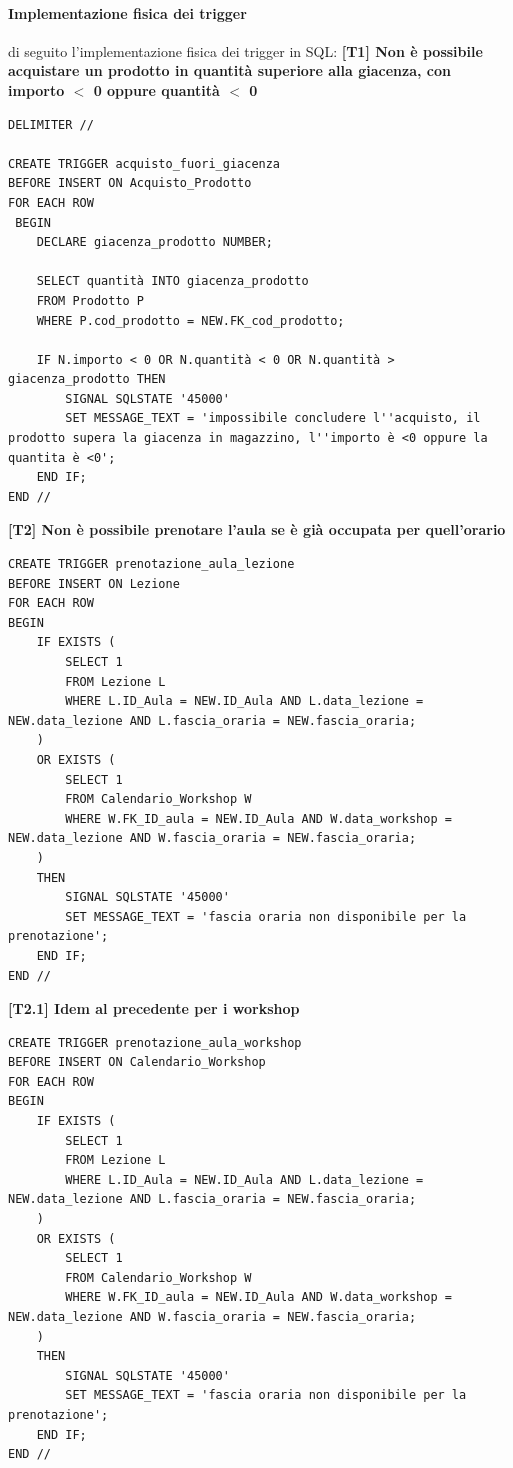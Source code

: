 \paragraph{Implementazione fisica dei trigger} di seguito l'implementazione fisica dei trigger in SQL: 
\newline
\newline
\textbf{[T1] Non è possibile acquistare un prodotto in quantità superiore alla giacenza, con importo $<$ 0 \newline oppure quantità $<$ 0}
\begin{lstlisting}
DELIMITER //

CREATE TRIGGER acquisto_fuori_giacenza 
BEFORE INSERT ON Acquisto_Prodotto
FOR EACH ROW
 BEGIN
	DECLARE giacenza_prodotto NUMBER; 
	
	SELECT quantità INTO giacenza_prodotto
	FROM Prodotto P
	WHERE P.cod_prodotto = NEW.FK_cod_prodotto;
	
	IF N.importo < 0 OR N.quantità < 0 OR N.quantità > giacenza_prodotto THEN 
		SIGNAL SQLSTATE '45000'
		SET MESSAGE_TEXT = 'impossibile concludere l''acquisto, il prodotto supera la giacenza in magazzino, l''importo è <0 oppure la quantita è <0'; 
    END IF; 
END //
\end{lstlisting}
\newpage
\textbf{[T2] Non è possibile prenotare l'aula se è già occupata per quell'orario}
\begin{lstlisting}
CREATE TRIGGER prenotazione_aula_lezione 
BEFORE INSERT ON Lezione
FOR EACH ROW
BEGIN
	IF EXISTS ( 
		SELECT 1 
		FROM Lezione L 
		WHERE L.ID_Aula = NEW.ID_Aula AND L.data_lezione = NEW.data_lezione AND L.fascia_oraria = NEW.fascia_oraria; 
	) 
	OR EXISTS ( 
		SELECT 1
		FROM Calendario_Workshop W 
		WHERE W.FK_ID_aula = NEW.ID_Aula AND W.data_workshop = NEW.data_lezione AND W.fascia_oraria = NEW.fascia_oraria; 
	) 
	THEN 
		SIGNAL SQLSTATE '45000' 
		SET MESSAGE_TEXT = 'fascia oraria non disponibile per la prenotazione'; 
	END IF; 
END // 
\end{lstlisting}
\newpage
\textbf{[T2.1] Idem al precedente per i workshop} 
\begin{lstlisting}
CREATE TRIGGER prenotazione_aula_workshop 
BEFORE INSERT ON Calendario_Workshop
FOR EACH ROW
BEGIN
	IF EXISTS ( 
		SELECT 1 
		FROM Lezione L 
		WHERE L.ID_Aula = NEW.ID_Aula AND L.data_lezione = NEW.data_lezione AND L.fascia_oraria = NEW.fascia_oraria; 
	) 
	OR EXISTS ( 
		SELECT 1
		FROM Calendario_Workshop W 
		WHERE W.FK_ID_aula = NEW.ID_Aula AND W.data_workshop = NEW.data_lezione AND W.fascia_oraria = NEW.fascia_oraria; 
	) 
	THEN 
		SIGNAL SQLSTATE '45000' 
		SET MESSAGE_TEXT = 'fascia oraria non disponibile per la prenotazione'; 
	END IF; 
END // 
\end{lstlisting}
